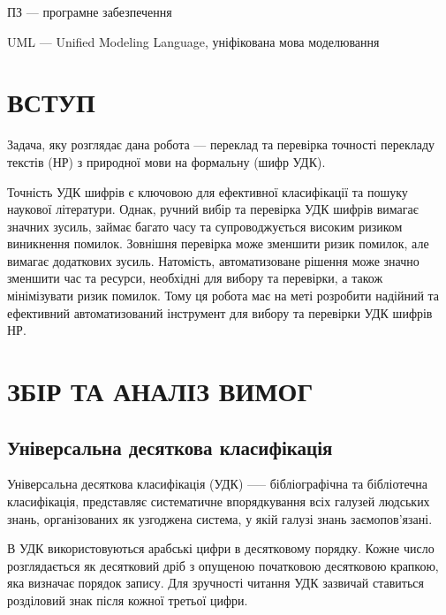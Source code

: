 \documentclass[14pt]{extarticle}
\let\oldsection\section
\renewcommand{\section}{\clearpage\oldsection}
\newcommand{\unnumberedSection}[1]{%
  \section*{#1}%
  \phantomsection
  \addcontentsline{toc}{section}{#1}%
}
\begin{document}
ПЗ --- програмне забезпечення

UML --- Unified Modeling Language, уніфікована мова моделювання

  \unnumberedSection{ВСТУП}  
  Задача, яку розглядає дана робота ---
  переклад та перевірка точності перекладу текстів \cite{wiki_nlp} (НР)
  з природної мови на формальну (шифр УДК).
  
  Точність УДК шифрів є ключовою для ефективної класифікації
  та пошуку наукової літератури.
  Однак, ручний вибір та перевірка УДК шифрів вимагає значних зусиль,
  займає багато часу та супроводжується високим ризиком виникнення помилок.
  Зовнішня перевірка може зменшити ризик помилок, але вимагає додаткових зусиль.
  Натомість, автоматизоване рішення може значно зменшити час та ресурси,
  необхідні для вибору та перевірки, а також мінімізувати ризик помилок.
  Тому ця робота має на меті розробити надійний
  та ефективний автоматизований інструмент для вибору
  та перевірки УДК шифрів НР.


  \section{ЗБІР ТА АНАЛІЗ ВИМОГ}

  \subsection{Універсальна десяткова класифікація}
  Універсальна десяткова класифікація (УДК) \cite{udc_wiki} —--
  бібліографічна та бібліотечна класифікація,
  представляє систематичне впорядкування всіх галузей людських знань,
  організованих як узгоджена система,
  у якій галузі знань заємопов’язані.
  
  В УДК використовуються арабські цифри в десятковому порядку.
  Кожне число розглядається як десятковий дріб
  з опущеною початковою десятковою крапкою, яка визначає порядок запису.
  Для зручності читання УДК зазвичай ставиться розділовий знак
  після кожної третьої цифри.
\end{document}
